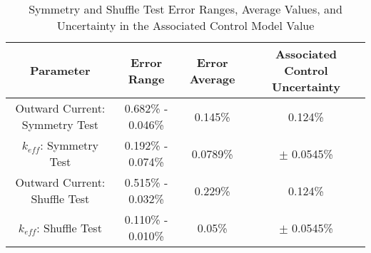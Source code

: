 \begin{table}[h!]
\centering
\caption{Symmetry and Shuffle Test Error Ranges, Average Values, and Uncertainty in the Associated Control Model Value}
\begin{tabular}{ c  c  c  c }
\hline
Parameter & Error Range & Error Average & Associated Control Uncertainty \\
\hline
Outward Current: Symmetry Test & 0.682\% - 0.046\% & 0.145\% & 0.124\% \\
$k_{eff}$: Symmetry Test & 0.192\% - 0.074\% & 0.0789\% & $\pm$ 0.0545\% \\
Outward Current: Shuffle Test & 0.515\% - 0.032\% & 0.229\% & 0.124\% \\
$k_{eff}$: Shuffle Test & 0.110\% - 0.010\% & 0.05\% & $\pm$ 0.0545\% \\
\hline
\end{tabular}

\label{table:con-tab1}
\end{table}